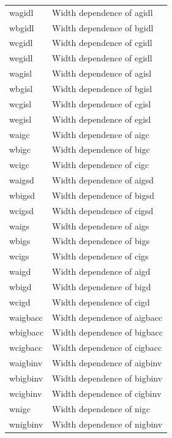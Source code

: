 \begin{longtable}{l l}
{\small wagidl} & {\small Width dependence of agidl} \\
{\small wbgidl} & {\small Width dependence of bgidl} \\
{\small wcgidl} & {\small Width dependence of cgidl} \\
{\small wegidl} & {\small Width dependence of egidl} \\
{\small wagisl} & {\small Width dependence of agisl} \\
{\small wbgisl} & {\small Width dependence of bgisl} \\
{\small wcgisl} & {\small Width dependence of cgisl} \\
{\small wegisl} & {\small Width dependence of egisl} \\
{\small waigc} & {\small Width dependence of aigc} \\
{\small wbigc} & {\small Width dependence of bigc} \\
{\small wcigc} & {\small Width dependence of cigc} \\
{\small waigsd} & {\small Width dependence of aigsd} \\
{\small wbigsd} & {\small Width dependence of bigsd} \\
{\small wcigsd} & {\small Width dependence of cigsd} \\
{\small waigs} & {\small Width dependence of aigs} \\
{\small wbigs} & {\small Width dependence of bigs} \\
{\small wcigs} & {\small Width dependence of cigs} \\
{\small waigd} & {\small Width dependence of aigd} \\
{\small wbigd} & {\small Width dependence of bigd} \\
{\small wcigd} & {\small Width dependence of cigd} \\
{\small waigbacc} & {\small Width dependence of aigbacc} \\
{\small wbigbacc} & {\small Width dependence of bigbacc} \\
{\small wcigbacc} & {\small Width dependence of cigbacc} \\
{\small waigbinv} & {\small Width dependence of aigbinv} \\
{\small wbigbinv} & {\small Width dependence of bigbinv} \\
{\small wcigbinv} & {\small Width dependence of cigbinv} \\
{\small wnigc} & {\small Width dependence of nigc} \\
{\small wnigbinv} & {\small Width dependence of nigbinv} \\

\end{longtable}
